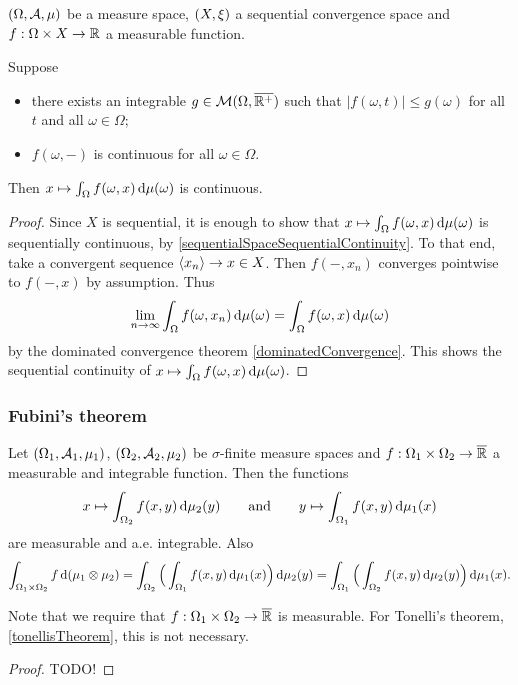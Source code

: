 \begin{lemma} \label{continuityIntegralTwoParameterFunction}
$\sSet{\Omega, \mathcal{A}, \mu}$ be a measure space, $\sSet{X,\xi}$ a sequential convergence space and $f: \Omega\times X \to \mathbb{R}$ a measurable function.

Suppose
\begin{itemize}
\item there exists an integrable $g\in\operatorname{\mathcal{M}}(\Omega, \overline{\mathbb{R}^+})$ such that $|f(\omega,t)| \leq g(\omega)$ for all $t$ and all $\omega\in \Omega$;
\item $f(\omega, -)$ is continuous for all $\omega\in\Omega$.
\end{itemize}
Then $x\mapsto \int_\Omega f(\omega, x)\operatorname{d \!}{\mu}(\omega)$ is continuous.
\end{lemma}
\begin{proof}
Since $X$ is sequential, it is enough to show that $x\mapsto \int_\Omega f(\omega, x)\operatorname{d \!}{\mu}(\omega)$ is sequentially continuous, by \ref{sequentialSpaceSequentialContinuity}. To that end, take a convergent sequence $\left\langle x_n \right\rangle\to x\in X$. Then $f(-, x_n)$ converges pointwise to $f(-,x)$ by assumption. Thus
\[ \lim_{n\to \infty} \int_\Omega f(\omega, x_n)\operatorname{d \!}{\mu}(\omega) = \int_\Omega f(\omega, x)\operatorname{d \!}{\mu}(\omega) \]
by the dominated convergence theorem \ref{dominatedConvergence}. This shows the sequential continuity of $x\mapsto \int_\Omega f(\omega, x)\operatorname{d \!}{\mu}(\omega)$.
\end{proof}

\subsubsection{Fubini's theorem}
\begin{theorem}
Let $\sSet{\Omega_1, \mathcal{A}_1, \mu_1}$, $\sSet{\Omega_2, \mathcal{A}_2, \mu_2}$ be $\sigma$-finite measure spaces and $f: \Omega_1\times\Omega_2 \to \overline{\mathbb{R}}$ a measurable and integrable function. Then the functions
\[ x\mapsto \int_{\Omega_2}f(x,y)\operatorname{d \!}{\mu_2(y)} \qquad\text{and}\qquad y\mapsto \int_{\Omega_1}f(x,y)\operatorname{d \!}{\mu_1(x)} \]
are measurable and a.e. integrable. Also
\[ \int_{\Omega_1\times\Omega_2}f\operatorname{d \!}{(\mu_1\otimes\mu_2)} = \int_{\Omega_2}\Big(\int_{\Omega_1}f(x,y)\operatorname{d \!}{\mu_1(x)}\Big)\operatorname{d \!}{\mu_2(y)} = \int_{\Omega_1}\Big(\int_{\Omega_2}f(x,y)\operatorname{d \!}{\mu_2(y)}\Big)\operatorname{d \!}{\mu_1(x)}. \]
\end{theorem}
Note that we require that $f: \Omega_1\times\Omega_2 \to \overline{\mathbb{R}}$ is measurable. For Tonelli's theorem, \ref{tonellisTheorem}, this is not necessary.
\begin{proof}
TODO!
\end{proof}

